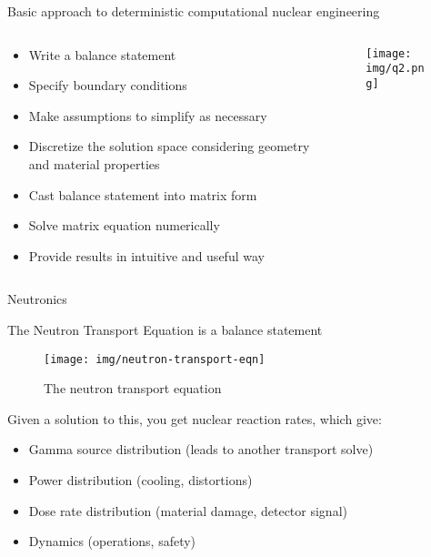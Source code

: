 \documentclass[pdf,aspectratio=169]{beamer}
\begin{document}
\begin{frame}{Basic approach to deterministic computational nuclear engineering}
    \begin{columns}
    \begin{column}{0.4\textwidth}
    \begin{itemize}
        \item Write a balance statement
        \item Specify boundary conditions
        \item Make assumptions to simplify as necessary
        \item Discretize the solution space considering geometry and material properties
        \item Cast balance statement into matrix form
        \item Solve matrix equation numerically
        \item Provide results in intuitive and useful way
    \end{itemize}
    \end{column}
    \begin{column}{0.4\textwidth}
        \begin{figure}[ht]
        \centering
            \texttt{[image: img/q2.png]}
        \end{figure}
    \end{column}
\end{columns}

\end{frame}

\begin{frame}[plain,c]
	\begin{center}
	\Huge Neutronics
	\end{center}
\end{frame}

\begin{frame}{The Neutron Transport Equation is a balance statement}
    \begin{center}
        \begin{figure}[ht]
        \centering
        \texttt{[image: img/neutron-transport-eqn]}
            \caption{\tiny The neutron transport equation}
        \end{figure}
    \end{center}
    Given a solution to this, you get nuclear reaction rates, which give:
    \begin{itemize}
        \item Gamma source distribution (leads to another transport solve)
        \item Power distribution (cooling, distortions)
        \item Dose rate distribution (material damage, detector signal)
        \item Dynamics (operations, safety)
    \end{itemize}

\end{frame}
\end{document}
